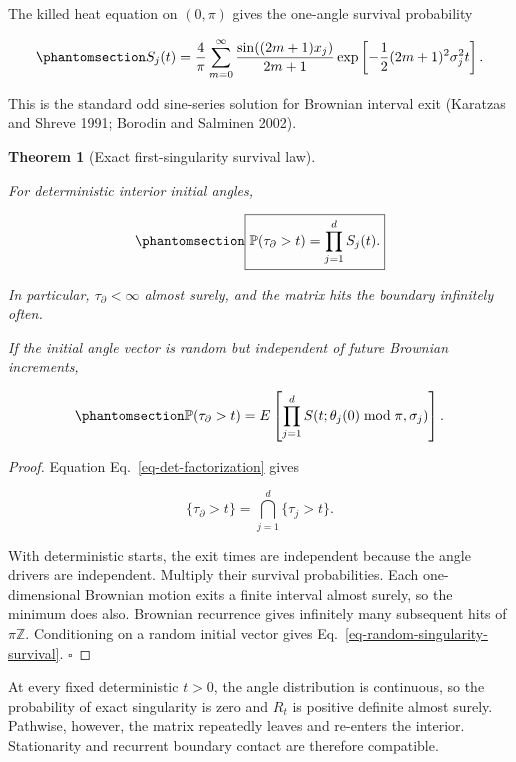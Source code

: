 \documentclass[
  english,
  11pt,
  letterpaper,
  DIV=11,
  numbers=noendperiod]{scrartcl}
\theoremstyle{plain}
\newtheorem{theorem}{Theorem}[section]
\theoremstyle{plain}
\theoremstyle{plain}
\theoremstyle{plain}
\theoremstyle{remark}
\begin{document}
The killed heat equation on \((0,\pi)\) gives the one-angle survival
probability

\begin{equation}\protect\phantomsection\label{eq-angle-survival}{
S_j(t)
=\frac4\pi
\sum_{m=0}^\infty
\frac{\sin((2m+1)x_j)}{2m+1}
\exp\left[
-\frac12(2m+1)^2\sigma_j^2t
\right].
}\end{equation}

This is the standard odd sine-series solution for Brownian interval exit
(Karatzas and Shreve 1991; Borodin and Salminen 2002).

\begin{theorem}[Exact first-singularity survival
law]\protect\hypertarget{thm-first-singularity}{}\label{thm-first-singularity}

For deterministic interior initial angles,

\begin{equation}\protect\phantomsection\label{eq-singularity-survival}{
\boxed{
\mathbb P(\tau_\partial>t)
=\prod_{j=1}^dS_j(t).
}
}\end{equation}

In particular, \(\tau_\partial<\infty\) almost surely, and the matrix
hits the boundary infinitely often.

If the initial angle vector is random but independent of future Brownian
increments,

\begin{equation}\protect\phantomsection\label{eq-random-singularity-survival}{
\mathbb P(\tau_\partial>t)
=E\left[
\prod_{j=1}^d
S(t;\theta_j(0)\bmod\pi,\sigma_j)
\right].
}\end{equation}

\end{theorem}

\begin{proof}
Equation Eq.~\ref{eq-det-factorization} gives

\[
\{\tau_\partial>t\}
=\bigcap_{j=1}^d\{\tau_j>t\}.
\]

With deterministic starts, the exit times are independent because the
angle drivers are independent. Multiply their survival probabilities.
Each one-dimensional Brownian motion exits a finite interval almost
surely, so the minimum does also. Brownian recurrence gives infinitely
many subsequent hits of \(\pi\mathbb Z\). Conditioning on a random
initial vector gives Eq.~\ref{eq-random-singularity-survival}.
\(\square\)
\end{proof}

At every fixed deterministic \(t>0\), the angle distribution is
continuous, so the probability of exact singularity is zero and \(R_t\)
is positive definite almost surely. Pathwise, however, the matrix
repeatedly leaves and re-enters the interior. Stationarity and recurrent
boundary contact are therefore compatible.
\end{document}
